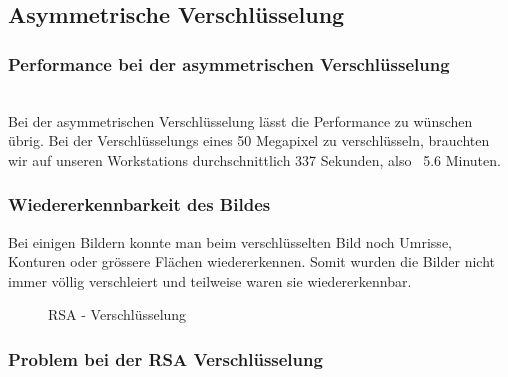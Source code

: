 \documentclass[paper=a4,fontsize=12pt]{scrartcl}
\begin{document}
\subsection{Asymmetrische Verschlüsselung}
\subsubsection{Performance bei der asymmetrischen Verschlüsselung}
 \\
Bei der asymmetrischen Verschlüsselung lässt die Performance zu wünschen übrig.
Bei der Verschlüsselungs eines 50 Megapixel zu verschlüsseln, brauchten wir auf unseren
Workstations durchschnittlich 337 Sekunden, also ~5.6 Minuten.
\subsubsection{Wiedererkennbarkeit des Bildes}
 Bei einigen Bildern konnte man beim verschlüsselten Bild noch Umrisse, Konturen oder grössere
 Flächen wiedererkennen.
 Somit wurden die Bilder nicht immer völlig verschleiert und teilweise waren sie wiedererkennbar.
 \begin{figure}[H] 
	\centering
	\caption[RSA - Verschlüsselung]{RSA - Verschlüsselung}  
	\label{asym-enc-result} 
\end{figure}

\subsubsection{Problem bei der RSA Verschlüsselung} \label{problems-RSA}
\end{document}
